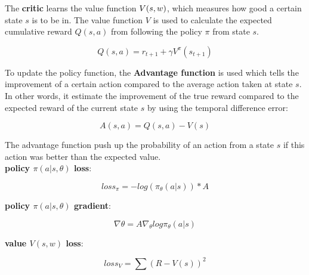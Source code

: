The \textbf{critic} learns the value function $\mathnormal{V(s, w)}$, which measures how good a certain state $s$ is to be in. The value function $V$ is used to calculate the expected cumulative reward $Q(s, a)$ from following the policy $\pi$ from state $s$.

\begin{equation}
	Q(s, a) = r_{t+1} + \gamma V^\pi(s_{t+1})
\end{equation}

To update the policy function, the \textbf{Advantage function} is used which tells the improvement of a certain action compared to the average action taken at state $s$. 
In other words, it estimate the improvement of the true reward compared to the expected reward of the current state $s$ by using the temporal difference error:

\begin{equation}
	A(s, a) = Q(s, a) - V(s)
\end{equation}

The advantage function push up the probability of an action from a state $s$ if this action was better than the expected value.\\

\textbf{policy $\pi(a | s, \theta)$ loss}: 

\begin{equation}
	loss_\pi = - log (\pi_\theta(a | s)) * A
\end{equation}

\textbf{policy $\pi(a | s, \theta)$ gradient}:


\begin{equation}
	\nabla \theta = A \nabla_\theta log \pi_\theta (a | s)
\end{equation}
	
\textbf{value $V(s, w)$ loss}:

\begin{equation}
	loss_V = \sum(R - V(s))^2
\end{equation}



		

